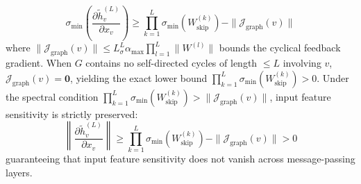\begin{theorem}
\begin{enumerate}
    \begin{equation}
    \sigma_{\min} \left( \frac{\partial \tilde{h}_v^{(L)}}{\partial x_v} \right) \ge \prod_{k=1}^L \sigma_{\min}(W_{\text{skip}}^{(k)}) - \|\mathcal{J}_{\text{graph}}(v)\|
    \end{equation}
    where $\|\mathcal{J}_{\text{graph}}(v)\| \le L_\sigma^L \alpha_{\max} \prod_{l=1}^L \|W^{(l)}\|$ bounds the cyclical feedback gradient. When $G$ contains no self-directed cycles of length $\le L$ involving $v$, $\mathcal{J}_{\text{graph}}(v) = \mathbf{0}$, yielding the exact lower bound $\prod_{k=1}^L \sigma_{\min}(W_{\text{skip}}^{(k)}) > 0$. Under the spectral condition $\prod_{k=1}^L \sigma_{\min}(W_{\text{skip}}^{(k)}) > \|\mathcal{J}_{\text{graph}}(v)\|$, input feature sensitivity is strictly preserved:
    \begin{equation}
    \left\| \frac{\partial \tilde{h}_v^{(L)}}{\partial x_v} \right\| \ge \prod_{k=1}^L \sigma_{\min}(W_{\text{skip}}^{(k)}) - \|\mathcal{J}_{\text{graph}}(v)\| > 0
    \end{equation}
    guaranteeing that input feature sensitivity does not vanish across message-passing layers.
\end{enumerate}
\end{theorem}

